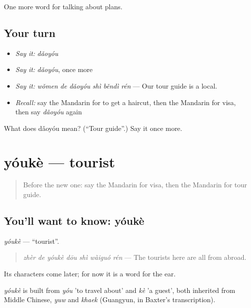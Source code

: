\begin{grammarlens}[title={What you've built}]
One more word for talking about plans.
\end{grammarlens}

\subsection*{Your turn}
\begin{itemize}
\raggedright
  \item \emph{Say it:} \emph{dǎoyóu}
  \item \emph{Say it:} \emph{dǎoyóu}, once more
  \item \emph{Say it:} \emph{wǒmen de dǎoyóu shì běndì rén} — Our tour guide is a local.
  \item \emph{Recall:} say the Mandarin for to get a haircut, then the Mandarin for visa, then say \emph{dǎoyóu} again
\end{itemize}

\begin{tcolorbox}[breakable,colback=teal!4,colframe=teal!35!black,title={Before you move on}]
What does dǎoyóu mean? (\textquotedblleft{}Tour guide\textquotedblright{}.) Say it once more.
\end{tcolorbox}
\section[yóukè]{yóukè — tourist}

\label{lesson:ZH-C213-youke}



\begin{quote}
Before the new one: say the Mandarin for visa, then the Mandarin for tour guide.
\end{quote}

\subsection*{You'll want to know: yóukè}
\emph{yóukè} — \textquotedblleft{}tourist\textquotedblright{}.

\begin{quote}
\emph{zhèr de yóukè dōu shì wàiguó rén} — The tourists here are all from abroad.
\end{quote}

Its characters come later; for now it is a word for the ear.

\begin{cousinweb}
\emph{yóukè} is built from \emph{yóu} 'to travel about' and \emph{kè} 'a guest', both inherited from Middle Chinese, \emph{yuw} and \emph{khaek} (Guangyun, in Baxter's transcription).
\end{cousinweb}

